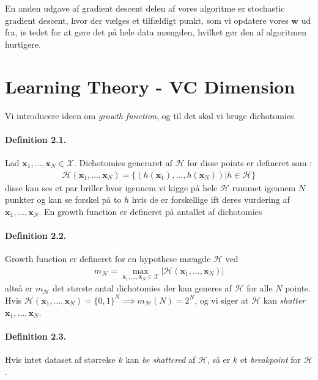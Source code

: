 \documentclass[paper=a4, fontsize=11pt]{scrartcl} %
\numberwithin{equation}{section} %
\numberwithin{figure}{section} %
\numberwithin{table}{section} %
\begin{document}
	En anden udgave af gradient descent delen af vores algoritme er stochastic gradient descent, hvor der vælges et tilfældigt punkt, som vi opdatere vores $\mathbf{w}$ ud fra, is tedet for at gøre det på hele data mængden, hvilket gør den af algoritmen hurtigere. 
	
	\newpage
	
	\section*{Learning Theory - VC Dimension}
			
	Vi introducere ideen om \textit{growth function}, og til det skal vi bruge dichotomies
	\paragraph{\textbf{Definition 2.1}.} Lad $\mathbf{x}_1,...,\mathbf{x}_N\in\mathcal{X}$. Dichotomies generaret af $\mathcal{H}$ for disse points er defineret som :
	\begin{align*}
	\mathcal{H}(\mathbf{x}_1,...,\mathbf{x}_N) =\{(h(\mathbf{x}_1),...,h(\mathbf{x}_N))|h\in\mathcal{H}\}	
	\end{align*}
	disse kan ses et par briller hvor igennem vi kigge på hele $\mathcal{H}$ rummet igennem $N$ punkter og kan se forskel på to $h$ hvis de er forskellige ift deres vurdering af $\mathbf{x}_1,...,\mathbf{x}_N$. En growth function er defineret på antallet af dichotomies
	\paragraph{\textbf{Definition 2.2}.} Growth function er defineret for en hypothese mængde $\mathcal{H}$ ved
	\begin{align*}
	m_\mathcal{H}=\underset{\mathbf{x}_1,...,\mathbf{x}_N\in\mathcal{X}}{\max}|\mathcal{H}(\mathbf{x}_1,...,\mathbf{x}_N)|
	\end{align*}
	altså er $m_\mathcal{H}$ det største antal dichotomies der kan generes af $\mathcal{H}$ for alle $N$ points. Hvis $\mathcal{H}(\mathbf{x}_1,...,\mathbf{x}_N)=\{0,1\}^N \implies m_\mathcal{H}(N)=2^N$, og vi siger at $\mathcal{H}$ kan \textit{shatter} $\mathbf{x}_1,...,\mathbf{x}_N$.
	\paragraph{\textbf{Definition 2.3}.} Hvis intet dataset af størrelse $k$ kan \textit{be shattered} af $\mathcal{H}$, så er $k$ et \textit{breakpoint} for $\mathcal{H}$. \\
	
\end{document}
